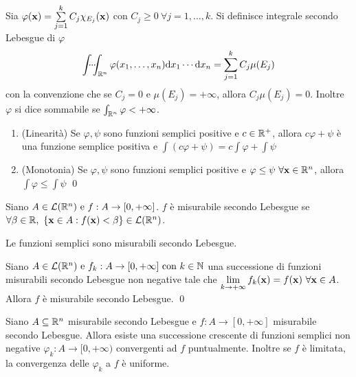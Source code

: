 \begin{definition}
	Sia $\varphi(\vb{x})=\sum\limits_{j=1}^k C_j \chi_{E_j}(\vb{x})$ con $C_j \geq 0 \ \forall j=1,\dots,k$. Si definisce integrale secondo Lebesgue di $\varphi$
	$$
		\idotsint_{\mathbb{R}^n}\varphi(x_1,\dots,x_n)\dd x_1 \cdots \dd x_n = \sum_{j=1}^kC_j\mu(E_j)
	$$
	con la convenzione che se $C_j=0$ e $\mu(E_j)=+\infty$, allora $C_j\mu(E_j)=0$.
	Inoltre $\varphi$ si dice sommabile se $\int_{\mathbb{R}^n} \varphi < + \infty$.
\end{definition}

\begin{theorem}
	\leavevmode
	\begin{enumerate}
		\item (Linearità) Se $\varphi,\psi$ sono funzioni semplici positive e $c\in \mathbb{R}^+$, allora $c\varphi + \psi$ è una funzione semplice positiva e $\int(c\varphi + \psi)=c\int\varphi +\int\psi$
		\item (Monotonia) Se $\varphi, \psi$ sono funzioni semplici positive e $\varphi \leq \psi \ \forall \vb{x} \in \mathbb{R}^n$, allora  $\int \varphi \leq \int \psi$
		\qed
	\end{enumerate}
\end{theorem}

\begin{definition}
	Siano $A \in \mathcal{L}(\mathbb{R}^n) \text{ e } f:A\to [0,+\infty]$. $f$ è misurabile secondo Lebesgue se $\forall \beta \in \mathbb{R}, \ \{\vb{x}\in A:f(\vb{x})<\beta\} \in \mathcal{L}(\mathbb{R}^n)$.
\end{definition}

\begin{remark}
	Le funzioni semplici sono misurabili secondo Lebesgue.
\end{remark}

\begin{theorem}
	Siano $A \in \mathcal{L}(\mathbb{R}^n) \text{ e } f_k:A \to [0,+\infty] \text{ con } k\in \mathbb{N}$ una successione di funzioni misurabili secondo Lebesgue non negative tale che $\lim\limits_{k\to +\infty}f_k(\vb{x})=f(\vb{x}) \ \forall \vb{x} \in A$. Allora $f$ è misurabile secondo Lebesgue.
	\qed
\end{theorem}

\begin{theorem}
	Siano $A \subseteq \mathbb{R}^n$ misurabile secondo Lebesgue e $f:A\to [0,+\infty]$ misurabile secondo Lebesgue. Allora esiste una successione crescente di funzioni semplici non negative $\varphi_k:A\to [0,+\infty)$ convergenti ad $f$ puntualmente. Inoltre se $f$ è limitata, la convergenza delle $\varphi_k$ a $f$ è uniforme.
\end{theorem}

